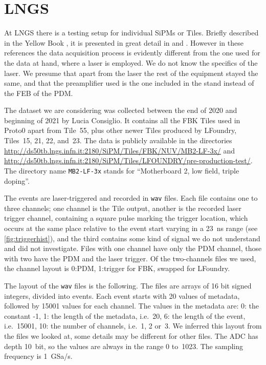 
\clearpage
\section{LNGS}

\newcommand\lngsport{2180}
\newcommand\lngsbase{http://ds50tb.lngs.infn.it:\lngsport/SiPM/Tiles}

At LNGS there is a testing setup for individual SiPMs or Tiles. Briefly
described in the Yellow Book \cite[34]{aalseth2018}, it is presented in great
detail in \cite{acerbi2017} and \cite[ch.~3]{savarese2018}. However in these
references the data acquisition process is evidently different from the one
used for the data at hand, where a laser is employed. We do not know the
specifics of the laser. We presume that apart from the laser the rest of the
equipment stayed the same, and that the preamplifier used is the one included
in the stand instead of the FEB of the PDM.

The dataset we are considering was collected between the end of 2020 and
beginning of 2021 by Lucia Consiglio. It contains all the FBK Tiles used in
Proto0 apart from Tile~55, plus other newer Tiles produced by LFoundry,
Tiles~15, 21, 22, and~23. The data is publicly available in the directories
\url{\lngsbase/FBK/NUV/MB2-LF-3x/} and
\url{\lngsbase/LFOUNDRY/pre-production-test/}. The directory name
\texttt{MB2-LF-3x} stands for ``Motherboard 2, low field, triple doping''.

The events are laser-triggered and recorded in \texttt{wav} files. Each file
contains one to three channels; one channel is the Tile output, another is the
recorded laser trigger channel, containing a square pulse marking the trigger
location, which occurs at the same place relative to the event start varying in
a \SI{23}{ns} range (see \autoref{fig:triggerhist}), and the third contains
some kind of signal we do not understand and did not investigate. Files with
one channel have only the PDM channel, those with two have the PDM and the
laser trigger. Of the two-channels files we used, the channel layout is 0:PDM,
1:trigger for FBK, swapped for LFoundry.

The layout of the \texttt{wav} files is the following. The files are arrays of
16 bit signed integers, divided into events. Each event starts with 20 values
of metadata, followed by \num{15001} values for each channel. The values in the
metadata are: 0: the constant -1, 1: the length of the metadata, i.e.\ 20, 6:
the length of the event, i.e.\ \num{15001}, 10: the number of channels, i.e.\
1, 2 or~3. We inferred this layout from the files we looked at, some details
may be different for other files. The ADC has depth 10~bit, so the values are
always in the range 0 to~1023. The sampling frequency is \SI{1}{GSa/s}.

